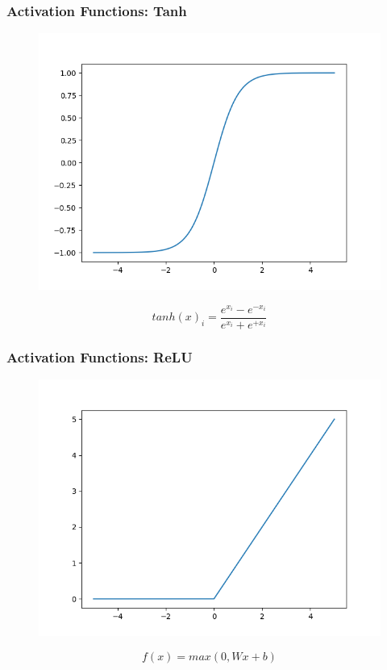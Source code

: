 \documentclass{beamer}
\begin{document}
\begin{frame}[fragile]
\frametitle{Activation Functions: Tanh}
\begin{figure}
		\includegraphics[scale=.4]{Images/Output/tanh.png}
\end{figure}
		\begin{equation}
			tanh(x)_i = \frac{e^{x_i}-e^{-x_i}}{e^{x_i}+e^{+x_i}}
		\end{equation}
\end{frame}

\begin{frame}[fragile]
\frametitle{Activation Functions: ReLU}
\begin{figure}
		\includegraphics[scale=.4]{Images/Output/relu.png}
\end{figure}
		\begin{equation}
			f(x) = max(0,Wx+b)
		\end{equation}
\end{frame}
\end{document}
